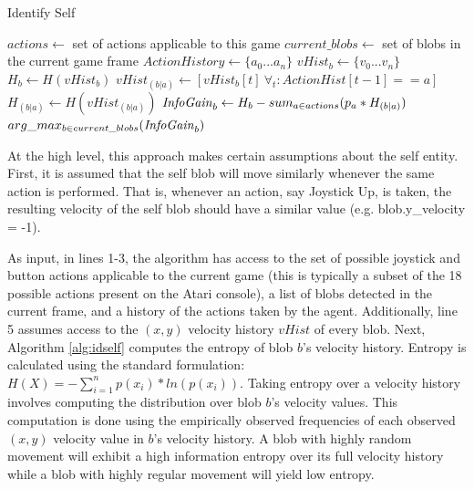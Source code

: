 \documentclass{acm_proc_article-sp}
\begin{document}
\begin{algorithm}
\caption{Identify Self}
\label{alg:idself}
\begin{algorithmic}[1]
  \STATE $actions \leftarrow $ set of actions applicable to this game
  \STATE $current\_blobs \leftarrow $ set of blobs in the current game frame
  \STATE $ActionHistory \leftarrow \{a_0...a_n\}$ %
  \STATE $vHist_b \leftarrow \{v_0...v_n\}$ %
  \STATE $H_b \leftarrow H(vHist_b)$ 
  \STATE $vHist_{(b|a)} \leftarrow [vHist_b[t] ~\forall_t: ActionHist[t-1] == a]$ 
  \STATE $H_{(b|a)} \leftarrow H(vHist_{(b|a)})$ %
  \ENDFOR
  \STATE $\textrm{\emph{InfoGain}}_b \leftarrow H_b - sum_{a \in actions}(p_a * H_{(b|a)})$ %
  \ENDFOR
  \RETURN $arg\_max_{b \in current\_blobs}(\textrm{\emph{InfoGain}}_b)$ %
\end{algorithmic}
\end{algorithm}

At the high level, this approach makes certain assumptions about the self entity. First, it is assumed that the self blob will move similarly whenever the same action is performed. That is, whenever an action, say Joystick Up, is taken, the resulting velocity of the self blob should have a similar value (e.g. blob.y\_velocity = -1). 

As input, in lines 1-3, the algorithm has access to the set of possible joystick and button actions applicable to the current game (this is typically a subset of the 18 possible actions present on the Atari console), a list of blobs detected in the current frame, and a history of the actions taken by the agent. Additionally, line 5 assumes access to the $(x,y)$ velocity history $vHist$ of every blob. Next, Algorithm \ref{alg:idself} computes the entropy of blob $b$'s velocity history. Entropy is calculated using the standard formulation: $H(X) = -\sum_{i=1}^n{p(x_i)*ln(p(x_i))}$. Taking entropy over a velocity history involves computing the distribution over blob $b$'s velocity values. This computation is done using the empirically observed frequencies of each observed $(x,y)$ velocity value in $b$'s velocity history. A blob with highly random movement will exhibit a high information entropy over its full velocity history while a blob with highly regular movement will yield low entropy.
\end{document}
